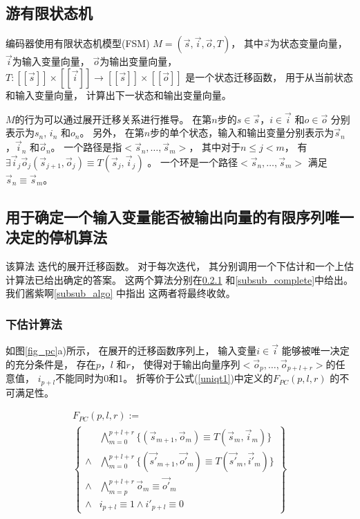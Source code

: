\subsection{游有限状态机}\label{subsec_fsm}


编码器使用有限状态机模型(FSM) $M=(\vec{s},\vec{i},\vec{o},T)$，
其中$\vec{s}$为状态变量向量，
$\vec{i}$为输入变量向量，
$\vec{o}$为输出变量向量，
$T: [\![\vec{s}]\!]\times [\![\vec{i}]\!]\to [\![\vec{s}]\!]\times [\![\vec{o}]\!]$
是一个状态迁移函数，
用于从当前状态和输入变量向量，
计算出下一状态和输出变量向量。

$M$的行为可以通过展开迁移关系进行推导。
在第$n$步的$s\in\vec{s}$，$i\in\vec{i}$ 和$o\in\vec{o}$
分别表示为$s_n$, $i_n$ 和$o_n$。
另外，
在第$n$步的单个状态，输入和输出变量分别表示为$\vec{s}_n$，$\vec{i}_n$ 和$\vec{o}_n$。
一个路径是指$<\vec{s}_n,\dots,\vec{s}_m>$，
其中对于$n\le j< m$，
有$\exists \vec{i}_j\vec{o}_j (\vec{s}_{j+1},\vec{o}_j)\equiv T(\vec{s}_j,\vec{i}_j)$ 。
一个环是一个路径$<\vec{s}_n,\dots,\vec{s}_m>$ 满足$\vec{s}_n\equiv \vec{s}_m$。

\subsection{用于确定一个输入变量能否被输出向量的有限序列唯一决定的停机算法}\label{subsec_chkextdec}

该算法\cite{ShenTCAD11} 迭代的展开迁移函数。
对于每次迭代，
其分别调用一个下估计和一个上估计算法已给出确定的答案。
这两个算法分别在\ref{subsub_sound} 和\ref{subsub_complete}中给出。
我们酱紫啊\ref{subsub_algo} 中指出
这两者将最终收敛。

\subsubsection{下估计算法}\label{subsub_sound}

如图\ref{fig_pc}a)所示，
在展开的迁移函数序列上，
输入变量$i\in\vec{i}$ 能够被唯一决定的充分条件是，
存在$p$，$l$ 和$r$，
使得对于输出向量序列$<\vec{o}_p,\dots,\vec{o}_{p+l+r}>$的任意值，
$i_{p+l}$不能同时为0和1。
折等价于公式(\ref{uniqt1})中定义的$F_{PC}(p,l,r)$ 的不可满足性。

\begin{multline}\label{uniqt1}
F_{PC}(p,l,r):=\\
\left\{
\begin{array}{cc}
&\bigwedge_{m=0}^{p+l+r}
\{
(\vec{s}_{m+1},\vec{o}_m)\equiv T(\vec{s}_m,\vec{i}_m)
\}
\\
\wedge&\bigwedge_{m=0}^{p+l+r}
\{
(\vec{s'}_{m+1},\vec{o'}_m)\equiv T(\vec{s'}_m,\vec{i'}_m)
\}
\\
\wedge&\bigwedge_{m=p}^{p+l+r}\vec{o}_m\equiv \vec{o'}_m \\
\wedge& i_{p+l}\equiv 1 \wedge  i'_{p+l}\equiv 0
\end{array}
\right\}
\end{multline}



